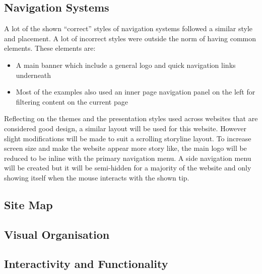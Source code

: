 \subsection{Navigation Systems}
A lot of the shown ``correct'' styles of navigation systems followed a similar style and placement. A lot of incorrect styles were outside the norm of having common elements. These elements are:
\begin{itemize}
	\item A main banner which include a general logo and quick navigation links underneath
	\item Most of the examples also used an inner page navigation panel on the left for filtering content on the current page	
\end{itemize}
Reflecting on the themes and the presentation styles used across websites that are considered good design, a similar layout will be used for this website. However slight modifications will be made to suit a scrolling storyline layout. To increase screen size and make the website appear more story like, the main logo will be reduced to be inline with the primary navigation menu. A side navigation menu will be created but it will be semi-hidden for a majority of the website and only showing itself when the mouse interacts with the shown tip.


\subsection{Site Map}

\subsection{Visual Organisation}

\subsection{Interactivity and Functionality}

